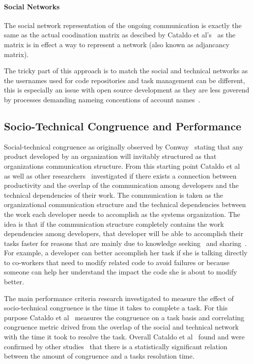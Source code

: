 \paragraph{Social Networks}
The social network representation of the ongoing communication is exactly the same as the actual coodination matrix as descibed by Cataldo et al's~\cite{cataldo:cscw:2006} as the matrix is in effect a way to represent a network (also known as adjancancy matrix).

The tricky part of this approach is to match the social and technical networks as the usernames used for code repositories and task management can be different, this is especially an issue with open source development as they are less goverend by processes demanding nameing concentions of account names~\cite{}.

\subsection{Socio-Technical Congruence and Performance}
Social-technical congruence as originally observed by Conway~\cite{} stating that any product developed by an organization will invitably structured as that organizations communication structure.
From this starting point Cataldo et al~\cite{cataldo:cscw:2006} as well as other researchers~\cite{} investigated if there exists a connection between productivity and the overlap of the communication among developers and the technical dependencies of their work.
The communication is taken as the organizational communication structure and the technical dependencies between the work each developer needs to accomplish as the systems organization.
The idea is that if the communication structure completely contains the work dependencies among developers, that developer will be able to accomplish their tasks faster for reasons that are mainly due to knowledge seeking~\cite{} and sharing~\cite{}.
For example, a developer can better accomplish her task if she is talking directly to co-workers that need to modify related code to avoid failures or because someone can help her understand the impact the code she is about to modify better.

The main performance criteria research investigated to measure the effect of socio-technical congruence is the time it takes to complete a task.
For this purpose Cataldo et al~\cite{cataldo:cscw:2006} measures the congruence on a task basis and correlating congruence metric drived from the overlap of the social and technical network with the time it took to resolve the task.
Overall Cataldo et al~\cite{cataldo:cscw:2006} found and were confirmed by other studies~\cite{} that there is a statistically significant relation between the amount of congruence and a tasks resolution time.

